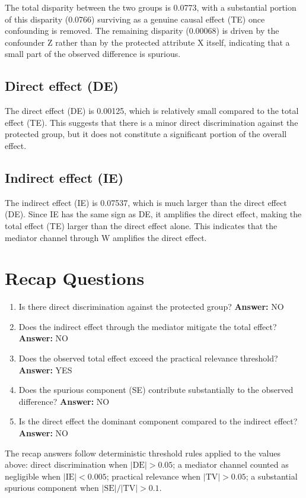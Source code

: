 \documentclass[11pt]{article}
\begin{document}
The total disparity between the two groups is 0.0773, with a substantial portion of this disparity (0.0766) surviving as a genuine causal effect (TE) once confounding is removed. The remaining disparity (0.00068) is driven by the confounder Z rather than by the protected attribute X itself, indicating that a small part of the observed difference is spurious.

\subsection{Direct effect (DE)}

The direct effect (DE) is 0.00125, which is relatively small compared to the total effect (TE). This suggests that there is a minor direct discrimination against the protected group, but it does not constitute a significant portion of the overall effect.

\subsection{Indirect effect (IE)}

The indirect effect (IE) is 0.07537, which is much larger than the direct effect (DE). Since IE has the same sign as DE, it amplifies the direct effect, making the total effect (TE) larger than the direct effect alone. This indicates that the mediator channel through W amplifies the direct effect.

\section{Recap Questions}

\begin{enumerate}
\item Is there direct discrimination against the protected group? \textbf{Answer:} NO
\item Does the indirect effect through the mediator mitigate the total effect? \textbf{Answer:} NO
\item Does the observed total effect exceed the practical relevance threshold? \textbf{Answer:} YES
\item Does the spurious component (SE) contribute substantially to the observed difference? \textbf{Answer:} NO
\item Is the direct effect the dominant component compared to the indirect effect? \textbf{Answer:} NO
\end{enumerate}

\vspace{1em}
\noindent\footnotesize
The recap answers follow deterministic threshold rules applied to the values above: direct discrimination when $|\mathrm{DE}| > 0.05$; a mediator channel counted as negligible when $|\mathrm{IE}| < 0.005$; practical relevance when $|\mathrm{TV}| > 0.05$; a substantial spurious component when $|\mathrm{SE}| / |\mathrm{TV}| > 0.1$.
\end{document}
